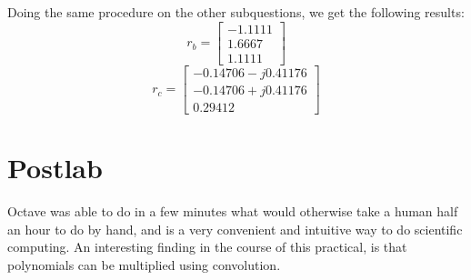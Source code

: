 \documentclass[12pt, a4paper]{article}
\begin{document}
			Doing the same procedure on the other subquestions, we get the following results:
			\[
				r_b =
				\begin{bmatrix}
					-1.1111 \\
					1.6667 \\
					1.1111
				\end{bmatrix}
			\]
			\[
				r_c =
				\begin{bmatrix}
					-0.14706 - j0.41176 \\
					-0.14706 + j0.41176 \\
					0.29412
				\end{bmatrix}
			\]


	\section{Postlab} %
	\label{sec:postlab}
		Octave was able to do in a few minutes what would otherwise take a human half an hour to do by hand, and is a very convenient and intuitive way to do scientific computing. An interesting finding in the course of this practical, is that polynomials can be multiplied using convolution.
\end{document}

